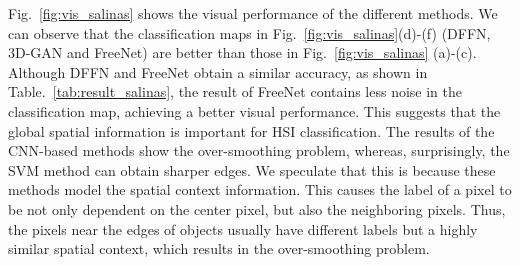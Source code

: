 \documentclass[journal]{IEEEtran}
\begin{document}
Fig.~\ref{fig:vis_salinas} shows the visual performance of the different methods.
We can observe that the classification maps in Fig.~\ref{fig:vis_salinas}(d)-(f) (DFFN, 3D-GAN and FreeNet) are better than those in Fig.~\ref{fig:vis_salinas} (a)-(c).
Although DFFN and FreeNet obtain a similar accuracy, as shown in Table.~\ref{tab:result_salinas}, the result of FreeNet contains less noise in the classification map, achieving a better visual performance.
This suggests that the global spatial information is important for HSI classification.
The results of the CNN-based methods show the over-smoothing problem, whereas, surprisingly, the SVM method can obtain sharper edges.
We speculate that this is because these methods model the spatial context information.
This causes the label of a pixel to be not only dependent on the center pixel, but also the neighboring pixels.
Thus, the pixels near the edges of objects usually have different labels but a highly similar spatial context, which results in the over-smoothing problem.
\end{document}
